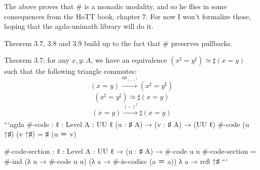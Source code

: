 The above proves that # is a monadic modality, and so he flies in some consequences from the HoTT book, chapter 7. For now I won't formalize those, hoping that the agda-unimath library will do it.

Theorem 3.7, 3.8 and 3.9 build up to the fact that # preserves pullbacks. 

Theorem 3.7: for any $x, y: A$, we have an equivalence $(x^\sharp = y^\sharp)\simeq \sharp(x=y)$ such that the following triangle commutes: 
$$(x=y)\xrightarrow[]{\mathrm{ap}_{(-)^\sharp}}(x^\sharp = y^\sharp)$$
$$(x^\sharp = y^\sharp) \simeq \sharp(x=y)$$
$$(x=y)\xrightarrow[]{(-)^\sharp}\sharp(x=y)$$
```agda
#-code : {ℓ : Level} {A : UU ℓ} (u : ♯ A) → (v : ♯ A) → (UU ℓ)
#-code (u ↑♯) (v ↑♯) = ♯ (u ＝ v)

#-code-section : {ℓ : Level} {A : UU ℓ} → (u : ♯ A) → #-code u u
#-code-section = #-ind (λ u → #-code u u) (λ a → #-is-codisc (a ＝ a)) λ a → refl ↑♯
```

 
